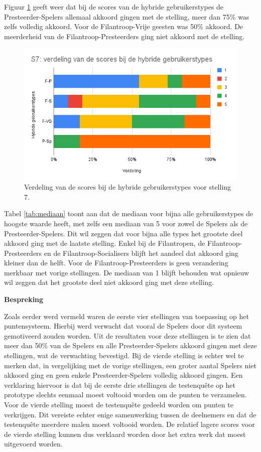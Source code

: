 Figuur \ref{fig:s7_hybride} geeft weer dat bij de scores van de hybride gebruikerstypes de Presteerder-Spelers allemaal akkoord gingen met de stelling, meer dan 75\% was zelfs volledig akkoord. Voor de Filantroop-Vrije geesten was 50\% akkoord. De meerderheid van de Filantroop-Presteerders ging niet akkoord met de stelling.

\begin{figure}
    \includegraphics[width=\linewidth]{S7_Hybride.png}
    \caption{Verdeling van de scores bij de hybride gebruikerstypes voor stelling 7.}
    \label{fig:s7_hybride}
\end{figure}

Tabel \ref{tab:mediaan} toont aan dat de mediaan voor bijna alle gebruikerstypes de hoogste waarde heeft, met zelfs een mediaan van 5 voor zowel de Spelers als de Presteerder-Spelers. Dit wil zeggen dat voor bijna alle types het grootste deel akkoord ging met de laatste stelling. Enkel bij de Filantropen, de Filantroop-Presteerders en de Filantroop-Socialisers blijft het aandeel dat akkoord ging kleiner dan de helft. Voor de Filantroop-Presteerders is geen verandering merkbaar met vorige stellingen. De mediaan van 1 blijft behouden wat opnieuw wil zeggen dat het grootste deel niet akkoord ging met deze stelling.

\textbf{Bespreking}

Zoals eerder werd vermeld waren de eerste vier stellingen van toepassing op het puntensysteem. Hierbij werd verwacht dat vooral de Spelers door dit systeem gemotiveerd zouden worden. Uit de resultaten voor deze stellingen is te zien dat meer dan 50\% van de Spelers en alle Presteerder-Spelers akkoord gingen met deze stellingen, wat de verwachting bevestigd. Bij de vierde stelling is echter wel te merken dat, in vergelijking met de vorige stellingen, een groter aantal Spelers niet akkoord ging en geen enkele Presteerder-Spelers volledig akkoord gingen. Een verklaring hiervoor is dat bij de eerste drie stellingen de testenquête op het prototype slechts eenmaal moest voltooid worden om de punten te verzamelen. Voor de vierde stelling moest de testenquête gedeeld worden om punten te verkrijgen. Dit vereiste echter enige samenwerking tussen de deelnemers en dat de testenquête meerdere malen moest voltooid worden. De relatief lagere scores voor de vierde stelling kunnen dus verklaard worden door het extra werk dat moest uitgevoerd worden.

